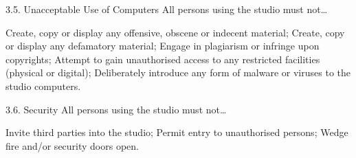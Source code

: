 3.5.	Unacceptable Use of Computers
All persons using the studio must not…

Create, copy or display any offensive, obscene or indecent material;
Create, copy or display any defamatory material;
Engage in plagiarism or infringe upon copyrights;
Attempt to gain unauthorised access to any restricted facilities (physical or digital);
Deliberately introduce any form of malware or viruses to the studio computers.

3.6.	Security
All persons using the studio must not…

Invite third parties into the studio;
Permit entry to unauthorised persons;
Wedge fire and/or security doors open.
